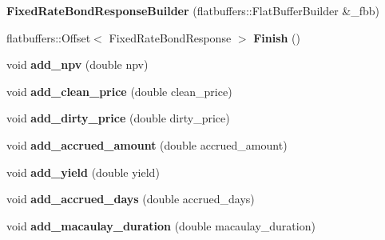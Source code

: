\begin{DoxyCompactItemize}
{\bfseries Fixed\+Rate\+Bond\+Response\+Builder} (flatbuffers\+::\+Flat\+Buffer\+Builder \&\+\_\+fbb)
\item 
\mbox{\label{structquantra_1_1FixedRateBondResponseBuilder_a7ea1076cb7eb9be4affd1354dee89e91}} 
flatbuffers\+::\+Offset$<$ Fixed\+Rate\+Bond\+Response $>$ {\bfseries Finish} ()
\item 
\mbox{\label{structquantra_1_1FixedRateBondResponseBuilder_a99320927862d6f204f37d5b95c64f9c2}} 
void {\bfseries add\+\_\+npv} (double npv)
\item 
\mbox{\label{structquantra_1_1FixedRateBondResponseBuilder_a2e2d9376f4a0330d83bea620817e7221}} 
void {\bfseries add\+\_\+clean\+\_\+price} (double clean\+\_\+price)
\item 
\mbox{\label{structquantra_1_1FixedRateBondResponseBuilder_a0b73a7ec559087f4bd63502fffbaa9bb}} 
void {\bfseries add\+\_\+dirty\+\_\+price} (double dirty\+\_\+price)
\item 
\mbox{\label{structquantra_1_1FixedRateBondResponseBuilder_aca3203d7591be4b6870bfbbaaea64d10}} 
void {\bfseries add\+\_\+accrued\+\_\+amount} (double accrued\+\_\+amount)
\item 
\mbox{\label{structquantra_1_1FixedRateBondResponseBuilder_a4cfbef559b5859b3c1aa140ed1ddeee1}} 
void {\bfseries add\+\_\+yield} (double yield)
\item 
\mbox{\label{structquantra_1_1FixedRateBondResponseBuilder_a0c73e0b1a225612427b1c0fd0ae762ef}} 
void {\bfseries add\+\_\+accrued\+\_\+days} (double accrued\+\_\+days)
\item 
\mbox{\label{structquantra_1_1FixedRateBondResponseBuilder_a44e122311b2dd052e558fba65642bc79}} 
void {\bfseries add\+\_\+macaulay\+\_\+duration} (double macaulay\+\_\+duration)
\item 
\mbox{\label{structquantra_1_1FixedRateBondResponseBuilder_a3078638f6ac639f6fa3b952936420fd2}} 

\end{DoxyCompactItemize}
